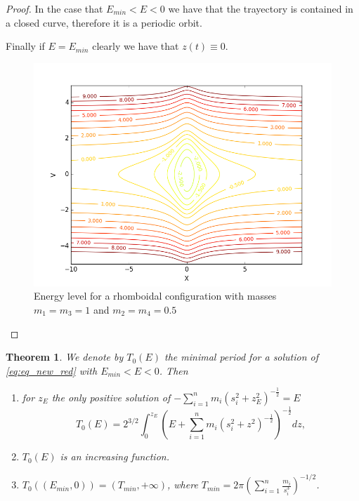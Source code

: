 \documentclass[twoside]{article}
\newtheorem{thm}{Theorem}[section]
\theoremstyle{remark}
\begin{document}
\begin{proof}
In the case that $E_{min}<E<0$ we have that the trayectory is contained in a closed curve, therefore it is a periodic orbit.

Finally if $E=E_{min}$ clearly we have that $z(t)\equiv 0$.
\begin{figure}[h]
\begin{center}
\includegraphics[scale=0.3]{figure_1.png}
\caption{Energy level for a rhomboidal configuration with masses $m_1=m_3=1$ and $m_2=m_4=0.5$}\label{fig:energy}
\end{center}
\end{figure}
\end{proof}

\begin{thm}\label{thm:prop.periodos}
We denote by $T_0(E)$ the minimal period for a solution of \eqref{eq:eq_new_red} with $E_{min}<E<0$. Then
\begin{enumerate}
 \item\label{it:T0.formula} for $z_E$ the only positive solution of $-\sum_{i=1}^n m_i (s_i^2+z_{E}^2)^{-\frac12}=E$
 \begin{equation}\label{eq:form.T0E-periodo}
 T_0(E)=2^{3/2}\int_{0}^{z_E} \left(E+\sum_{i=1}^n m_i (s_i^2+z^2)^{-\frac12}\right)^{-\frac12} dz,
 \end{equation}
 \item\label{it:T0.creciente} $T_0(E)$ is an increasing function.
 \item\label{it:T0.rango} $T_0\left((E_{min},0)\right)=(T_{min},+\infty)$, where  $T_{min}=2\pi\left(\sum_{i=1}^n\frac{m_i}{s_i^3} \right)^{-1/2}$.

 \end{enumerate}
\end{thm}
\end{document}
